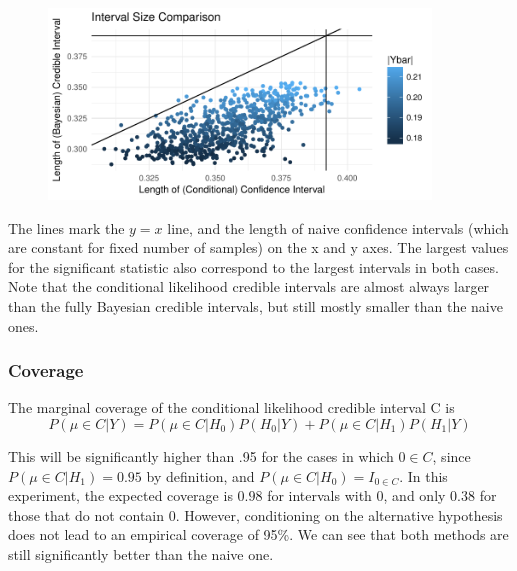 \documentclass[AMA,STIX1COL]{WileyNJD-v2}\usepackage[]{graphicx}\usepackage[]{color}
\newenvironment{knitrout}{}{} %
\begin{document}
\begin{figure}
\begin{knitrout}
\color{fgcolor}

{\centering \includegraphics[width=4in]{figure/unnamed-chunk-11-1} 

}



\end{knitrout}
\end{figure}

The lines mark the $y = x$ line, and the length of naive confidence intervals (which are constant for fixed number of samples) on the x and y axes. The largest values for the significant statistic also correspond to the largest intervals in both cases. Note that the conditional likelihood credible intervals are almost always larger than the fully Bayesian credible intervals, but still mostly smaller than the naive ones. 

\subsubsection{Coverage}


The marginal coverage of the conditional likelihood credible interval C is 
\begin{equation}
P(\mu \in C|Y) = P(\mu \in C|H_0) P(H_0|Y)+P(\mu \in C|H_1) P(H_1|Y)
\end{equation}

This will be significantly higher than .95 for the cases in which $0 \in C$, since $P(\mu \in C|H_1) =0.95$ by definition, and  $P(\mu \in C|H_0) = I_{0 \in C}$. In this experiment, the expected coverage is $0.98$ for intervals with 0, and only $0.38$ for those that do not contain 0.  However, conditioning on the alternative hypothesis does not lead to an empirical coverage of 95\%. We can see that both methods are still significantly better than the naive one.
\end{document}

